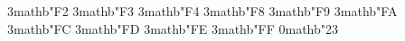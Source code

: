 \DeclareMathSymbol{\curvearrowleftright}   {3}{mathb}{"F2}
\DeclareMathSymbol{\curvearrowbotleft}     {3}{mathb}{"F3}
\DeclareMathSymbol{\curvearrowbotright}    {3}{mathb}{"F4}
\DeclareMathSymbol{\leftsquigarrow}        {3}{mathb}{"F8}
\DeclareMathSymbol{\rightsquigarrow}       {3}{mathb}{"F9}
\DeclareMathSymbol{\leftrightsquigarrow}   {3}{mathb}{"FA}
\DeclareMathSymbol{\lefttorightarrow}      {3}{mathb}{"FC}
\DeclareMathSymbol{\righttoleftarrow}      {3}{mathb}{"FD}
\DeclareMathSymbol{\uptodownarrow}         {3}{mathb}{"FE}
\DeclareMathSymbol{\downtouparrow}         {3}{mathb}{"FF}
\DeclareMathSymbol{\varhash}       {0}{mathb}{"23}

\DeclareMathOperator\lan{Lan}
\DeclareMathOperator\ran{Ran}
\DeclareMathOperator\colim{colim}
\DeclareMathOperator\coeq{coeq}
\DeclareMathOperator\eq{eq}
\DeclareMathOperator\Tot{Tot}
\DeclareMathOperator\cosk{cosk}
\DeclareMathOperator\sk{sk}
\DeclareMathOperator\Spec{Spec}
\DeclareMathOperator\Ho{Ho}
\DeclareMathOperator\Aut{Aut}
\DeclareMathOperator\End{End}
\DeclareMathOperator\Hom{Hom}
\DeclareMathOperator\Map{Map}

\newcommand{\too}[1][]{\ensuremath{\overset{#1}{\longrightarrow}}}
\newcommand{\ot}{\ensuremath{\leftarrow}}
\newcommand{\oot}[1][]{\ensuremath{\overset{#1}{\longleftarrow}}}
\let\toot\rightleftarrows
\let\otto\leftrightarrows
\let\Impl\Rightarrow
\let\imp\Rightarrow
\let\toto\rightrightarrows
\let\into\hookrightarrow
\let\xinto\xhookrightarrow
\mdef\we{\overset{\sim}{\longrightarrow}}
\mdef\leftwe{\overset{\sim}{\longleftarrow}}
\let\mono\rightarrowtail
\let\leftmono\leftarrowtail
\let\cof\rightarrowtail
\let\leftcof\leftarrowtail
\let\epi\twoheadrightarrow
\let\leftepi\twoheadleftarrow
\let\fib\twoheadrightarrow
\let\leftfib\twoheadleftarrow
\let\cohto\rightsquigarrow
\let\maps\colon
\newcommand{\spam}{\,:\!}       %
\def\acof{\mathrel{\mathrlap{\hspace{3pt}\raisebox{4pt}{$\scriptscriptstyle\sim$}}\mathord{\rightarrowtail}}}


\let\xto\xrightarrow
\let\xot\xleftarrow
\def\rightarrowtailfill@{\arrowfill@{\Yright\joinrel\relbar}\relbar\rightarrow}
\newcommand\xrightarrowtail[2][]{\ext@arrow 0055{\rightarrowtailfill@}{#1}{#2}}
\let\xmono\xrightarrowtail
\let\xcof\xrightarrowtail
\def\twoheadrightarrowfill@{\arrowfill@{\relbar\joinrel\relbar}\relbar\twoheadrightarrow}
\newcommand\xtwoheadrightarrow[2][]{\ext@arrow 0055{\twoheadrightarrowfill@}{#1}{#2}}
\let\xepi\xtwoheadrightarrow
\let\xfib\xtwoheadrightarrow

